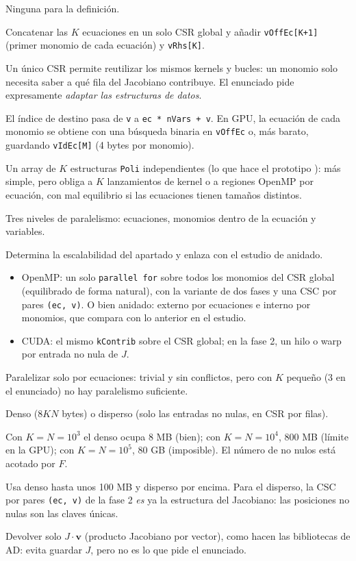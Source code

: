\alt Ninguna para la definición.

\que Concatenar las $K$ ecuaciones en un solo CSR global y añadir \texttt{vOffEc[K+1]} (primer monomio de cada ecuación) y \texttt{vRhs[K]}.

\porque Un único CSR permite reutilizar los mismos kernels y bucles: un monomio solo necesita saber a qué fila del Jacobiano contribuye. El enunciado pide expresamente \emph{adaptar las estructuras de datos}.

\como El índice de destino pasa de \texttt{v} a \texttt{ec * nVars + v}. En GPU, la ecuación de cada monomio se obtiene con una búsqueda binaria en \texttt{vOffEc} o, más barato, guardando \texttt{vIdEc[M]} (4 bytes por monomio).

\alt Un array de $K$ estructuras \texttt{Poli} independientes (lo que hace el prototipo ): más simple, pero obliga a $K$ lanzamientos de kernel o a regiones OpenMP por ecuación, con mal equilibrio si las ecuaciones tienen tamaños distintos.

\que Tres niveles de paralelismo: ecuaciones, monomios dentro de la ecuación y variables.

\porque Determina la escalabilidad del apartado y enlaza con el estudio de anidado.

\como
\begin{itemize}
\item OpenMP: un solo \texttt{parallel for} sobre todos los monomios del CSR global (equilibrado de forma natural), con la variante de dos fases y una CSC por pares \texttt{(ec, v)}. O bien anidado: externo por ecuaciones e interno por monomios, que compara con lo anterior en el estudio.
\item CUDA: el mismo \texttt{kContrib} sobre el CSR global; en la fase 2, un hilo o warp por entrada no nula de $J$.
\end{itemize}

\alt Paralelizar solo por ecuaciones: trivial y sin conflictos, pero con $K$ pequeño (3 en el enunciado) no hay paralelismo suficiente.

\que Denso ($8KN$ bytes) o disperso (solo las entradas no nulas, en CSR por filas).

\porque Con $K=N=10^3$ el denso ocupa 8 MB (bien); con $K=N=10^4$, 800 MB (límite en la GPU); con $K=N=10^5$, 80 GB (imposible). El número de no nulos está acotado por $F$.

\como Usa denso hasta unos 100 MB y disperso por encima. Para el disperso, la CSC por pares \texttt{(ec, v)} de la fase 2 \emph{es} ya la estructura del Jacobiano: las posiciones no nulas son las claves únicas.

\alt Devolver solo $J\cdot\mathbf{v}$ (producto Jacobiano por vector), como hacen las bibliotecas de AD: evita guardar $J$, pero no es lo que pide el enunciado.
\clearpage
